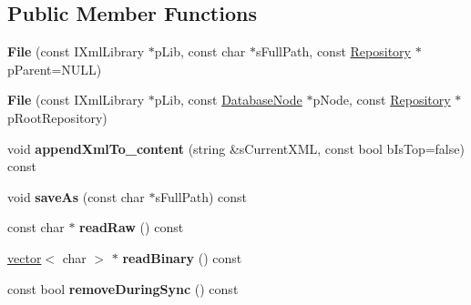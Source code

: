 \subsection*{\-Public \-Member \-Functions}
\begin{DoxyCompactItemize}
\item 
\hypertarget{classgeneral__server_1_1File_ae36ccfff166c646ce240fa53a79b96bc}{{\bfseries \-File} (const \-I\-Xml\-Library $\ast$p\-Lib, const char $\ast$s\-Full\-Path, const \hyperlink{classgeneral__server_1_1Repository}{\-Repository} $\ast$p\-Parent=\-N\-U\-L\-L)}\label{classgeneral__server_1_1File_ae36ccfff166c646ce240fa53a79b96bc}

\item 
\hypertarget{classgeneral__server_1_1File_a56a3940f42e4011378b9ace0919b55d6}{{\bfseries \-File} (const \-I\-Xml\-Library $\ast$p\-Lib, const \hyperlink{classgeneral__server_1_1DatabaseNode}{\-Database\-Node} $\ast$p\-Node, const \hyperlink{classgeneral__server_1_1Repository}{\-Repository} $\ast$p\-Root\-Repository)}\label{classgeneral__server_1_1File_a56a3940f42e4011378b9ace0919b55d6}

\item 
\hypertarget{classgeneral__server_1_1File_ac6bb715ace08c33255073625e486a45c}{void {\bfseries append\-Xml\-To\-\_\-content} (string \&s\-Current\-X\-M\-L, const bool b\-Is\-Top=false) const }\label{classgeneral__server_1_1File_ac6bb715ace08c33255073625e486a45c}

\item 
\hypertarget{classgeneral__server_1_1File_a07e11dd084d6554e1df16053853c17ff}{void {\bfseries save\-As} (const char $\ast$s\-Full\-Path) const }\label{classgeneral__server_1_1File_a07e11dd084d6554e1df16053853c17ff}

\item 
\hypertarget{classgeneral__server_1_1File_ab416d27bce2bee3fe44430241441e99b}{const char $\ast$ {\bfseries read\-Raw} () const }\label{classgeneral__server_1_1File_ab416d27bce2bee3fe44430241441e99b}

\item 
\hypertarget{classgeneral__server_1_1File_ae8850652decb8390cbcaaef98b79d6e2}{\hyperlink{classvector}{vector}$<$ char $>$ $\ast$ {\bfseries read\-Binary} () const }\label{classgeneral__server_1_1File_ae8850652decb8390cbcaaef98b79d6e2}

\item 
\hypertarget{classgeneral__server_1_1File_a9709cd35f1381e140e77b0cd79c6ca21}{const bool {\bfseries remove\-During\-Sync} () const }\label{classgeneral__server_1_1File_a9709cd35f1381e140e77b0cd79c6ca21}


\end{DoxyCompactItemize}
